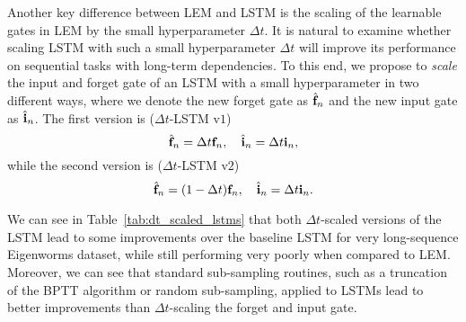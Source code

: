 \documentclass{article} \usepackage{iclr2022_conference,times}
\newcommand{\Dt}{{\Delta t}}
\newcommand{\Tref}[1]{Table~\ref{#1}}
\begin{document}
Another key difference between LEM and LSTM is the scaling of the learnable gates in LEM by the small hyperparameter $\Dt$. It is natural to examine whether scaling LSTM with such a small hyperparameter $\Dt$ will improve its performance on sequential tasks with long-term dependencies. To this end, we propose to \emph{scale} the input and forget gate of an LSTM with a small hyperparameter in two different ways, where we denote the new forget gate as $\hat{{\bf f}}_n$ and the new input gate as $\hat{{\bf i}}_n$. The first version is ($\Dt$-LSTM v$1$)
\begin{equation*}
    \hat{{\bf f}}_n = \Dt{\bf f}_n, \quad \hat{{\bf i}}_n = \Dt{\bf i}_n,
\end{equation*}
while the second version is ($\Dt$-LSTM v$2$)
\begin{equation*}
    \hat{{\bf f}}_n = (1-\Dt){\bf f}_n, \quad \hat{{\bf i}}_n = \Dt{\bf i}_n.
\end{equation*}

We can see in \Tref{tab:dt_scaled_lstms} that both $\Dt$-scaled versions of the LSTM lead to some improvements over the baseline LSTM for very long-sequence Eigenworms dataset, while still performing very poorly when compared to LEM. Moreover, we can see that standard sub-sampling routines, such as a truncation of the BPTT algorithm or random sub-sampling, applied to LSTMs lead to better improvements than $\Dt$-scaling the forget and input gate.
\end{document}
